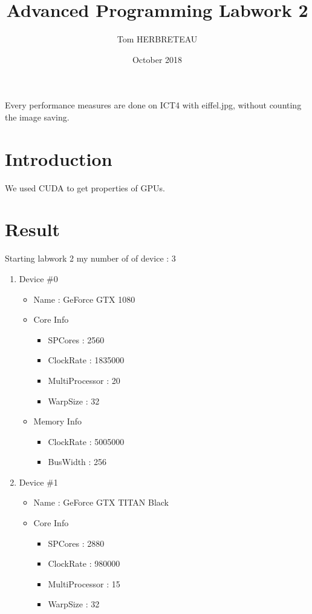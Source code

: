 \documentclass{article}
\title{Advanced Programming Labwork 2}
\author{Tom HERBRETEAU }
\date{October 2018}
\begin{document}
\maketitle
Every performance measures are done on ICT4 with eiffel.jpg, without counting the image saving.
\section{Introduction}
We used CUDA to get properties of GPUs.

\section{Result}
\newline Starting labwork 2
\newline my number of of device :  3
\begin{enumerate}
    \item Device \#0
    \begin{itemize}
        \item Name : GeForce GTX 1080
        \item Core Info
        \begin{itemize}
            \item SPCores : 2560
            \item ClockRate : 1835000
            \item MultiProcessor : 20
            \item WarpSize : 32
        \end{itemize}
        \item Memory Info
        \begin{itemize}
            \item ClockRate : 5005000
            \item BusWidth : 256
        \end{itemize}
    \end{itemize}
    \item Device \#1
    \begin{itemize}
        \item Name : GeForce GTX TITAN Black
        \item Core Info
        \begin{itemize}
            \item SPCores : 2880
            \item ClockRate : 980000
            \item MultiProcessor : 15
            \item WarpSize : 32

\end{itemize}
\end{itemize}
\end{enumerate}
\end{document}
